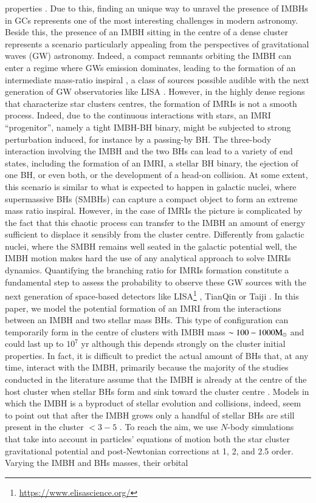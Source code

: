 \documentclass[article]{aa}
\newcommand{\Ms}{{\rm M}_\odot}
\begin{document}
properties \citep{AAG18a}. Due to this, finding an unique way to unravel the presence of IMBHs in GCs represents one of the most interesting challenges in modern astronomy. Beside this, the presence of an IMBH sitting in the centre of a dense cluster represents a scenario particularly appealing from the perspectives of gravitational waves (GW) astronomy. Indeed, a compact remnants orbiting the IMBH can enter a regime where GWs emission dominates, leading to the formation of an intermediate mass-ratio inspiral \citep[IMRI,][]{konstantinidis13,leigh14,haster16,macleod16}, a class of sources possible audible with the next generation of GW observatories like LISA \citep{seoane07,amaro12,seoane18}. However, in the highly dense regions that characterize star clusters centres, the formation of IMRIs is not a smooth process. Indeed, due to the continuous interactions with stars, an IMRI ``progenitor'', namely a tight IMBH-BH binary, might be subjected to strong perturbation induced, for instance by a passing-by BH. The three-body interaction involving the IMBH and the two BHs can lead to a variety of end states, including the formation of an IMRI, a stellar BH binary, the ejection of one BH, or even both, or the development of a head-on collision. At some extent, this scenario is similar to what is expected to happen in galactic nuclei, where supermassive BHs (SMBHs) can capture a compact object to form an extreme mass ratio inspiral. However, in the case of IMRIs the picture is complicated by the fact that this chaotic process can transfer to the IMBH an amount of energy sufficient to displace it sensibly from the cluster centre. Differently from galactic nuclei, where the SMBH remains well seated in the galactic potential well, the IMBH motion makes hard the use of any analytical approach to solve IMRIs dynamics. Quantifying the branching ratio for IMRIs formation constitute a fundamental step to assess the probability to observe these GW sources with the next generation of space-based detectors like LISA\footnote{\url{https://www.elisascience.org/}} \citep{seoane07,amaro12}, TianQin \citep{tianqin16} or Taiji \citep{taiji17}. In this paper, we model the potential formation of an IMRI from the interactions between an IMBH and two stellar mass BHs. This type of  configuration can temporarily form in the centre of clusters with IMBH mass $\sim 100-1000\Ms$ \citep{konstantinidis13,macleod16} and could last up to $10^7$ yr \citep{macleod16} although this depends strongly on the cluster initial properties. In fact, it is difficult to predict the actual amount of BHs that, at any time, interact with the IMBH, primarily because the majority of the studies conducted in the literature assume that the IMBH is already at the centre of the host cluster when stellar BHs form and sink toward the cluster centre \citep{leigh14,haster16}. Models in which the IMBH is a byproduct of stellar evolution and collisions, indeed, seem to point out that after the IMBH grows only a handful of stellar BHs are still present in the cluster $<3-5$ \citep{AAG19}. To reach the aim, we use $N$-body simulations that take into account in particles' equations of motion both the star cluster gravitational potential and post-Newtonian corrections at 1, 2, and 2.5 order. Varying the IMBH and BHs masses, their orbital 
\end{document}
